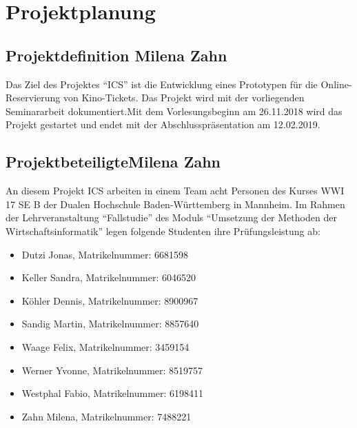 \chapter{Projektplanung}
	
	\section[Projektdefinition]{Projektdefinition {\hfill \normalsize Milena Zahn}}
	Das Ziel des Projektes \enquote{\ac{ICS}} ist die Entwicklung eines Prototypen für die Online-Reservierung von Kino-Tickets. Das Projekt wird mit der vorliegenden Seminararbeit dokumentiert.Mit dem Vorlesungsbeginn am 26.11.2018 wird das Projekt gestartet und endet mit der Abschlusspräsentation am 12.02.2019.
	
	\section[Projektbeteiligte]{Projektbeteiligte{\hfill \normalsize Milena Zahn}}
	An diesem Projekt \ac{ICS} arbeiten in einem Team acht Personen des Kurses WWI 17 SE B der Dualen Hochschule Baden-Württemberg in Mannheim. Im Rahmen der Lehrveranstaltung \enquote{Fallstudie} des Moduls \enquote{Umsetzung der Methoden der Wirtschaftsinformatik} legen folgende Studenten ihre Prüfungsleistung ab:
	\begin{singlespacing}
	\begin{itemize}
		\item Dutzi Jonas, Matrikelnummer: 6681598
		\item Keller Sandra, Matrikelnummer: 6046520 
		\item Köhler Dennis, Matrikelnummer: 8900967 
		\item Sandig Martin, Matrikelnummer: 8857640 
		\item Waage Felix, Matrikelnummer: 3459154 
		\item Werner Yvonne, Matrikelnummer: 8519757 
		\item Westphal Fabio, Matrikelnummer: 6198411  
		\item Zahn Milena, Matrikelnummer: 7488221 
	\end{itemize}
	\end{singlespacing}

